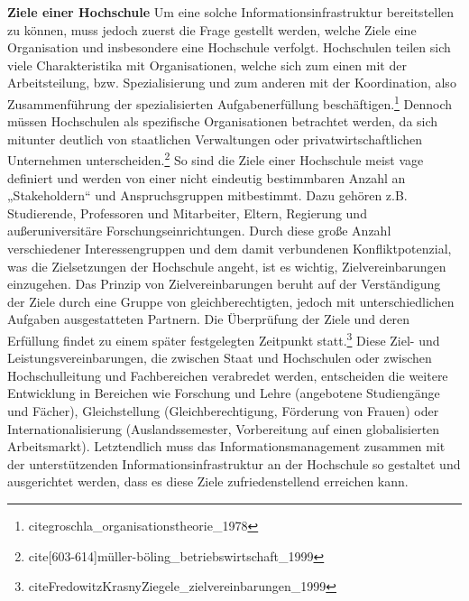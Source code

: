 \textbf{Ziele einer Hochschule}
Um eine solche Informationsinfrastruktur bereitstellen zu können, muss jedoch zuerst die Frage gestellt werden, welche Ziele eine Organisation und insbesondere eine Hochschule verfolgt.
Hochschulen teilen sich viele Charakteristika mit Organisationen, welche sich zum einen mit der Arbeitsteilung, bzw. Spezialisierung und zum anderen mit der Koordination, also  Zusammenführung der spezialisierten Aufgabenerfüllung beschäftigen.\footnote{cite{groschla_organisationstheorie_1978}} Dennoch müssen Hochschulen als spezifische Organisationen betrachtet werden, da sich mitunter deutlich von staatlichen Verwaltungen oder privatwirtschaftlichen Unternehmen unterscheiden.\footnote{cite[603-614]{müller-böling_betriebswirtschaft_1999}}
So sind die Ziele einer Hochschule meist vage definiert und werden von einer nicht eindeutig bestimmbaren Anzahl an „Stakeholdern“ und Anspruchsgruppen mitbestimmt. Dazu gehören z.B. Studierende, Professoren und Mitarbeiter, Eltern, Regierung und außeruniversitäre Forschungseinrichtungen.
Durch diese große Anzahl verschiedener Interessengruppen und dem damit verbundenen Konfliktpotenzial, was die Zielsetzungen der Hochschule angeht, ist es wichtig, Zielvereinbarungen einzugehen. Das Prinzip von Zielvereinbarungen beruht auf der Verständigung der Ziele durch eine Gruppe von gleichberechtigten, jedoch mit unterschiedlichen Aufgaben ausgestatteten Partnern. Die Überprüfung der Ziele und deren Erfüllung findet zu einem später festgelegten Zeitpunkt statt.\footnote{cite{FredowitzKrasnyZiegele_zielvereinbarungen_1999}}
Diese Ziel- und Leistungsvereinbarungen, die zwischen Staat und Hochschulen oder zwischen Hochschulleitung und Fachbereichen verabredet werden, entscheiden die weitere Entwicklung in Bereichen wie Forschung und Lehre (angebotene Studiengänge und Fächer), Gleichstellung (Gleichberechtigung, Förderung von Frauen) oder Internationalisierung (Auslandssemester, Vorbereitung auf einen globalisierten Arbeitsmarkt).
Letztendlich muss das Informationsmanagement zusammen mit der unterstützenden Informationsinfrastruktur an der Hochschule so gestaltet und ausgerichtet werden, dass es diese Ziele zufriedenstellend erreichen kann. 
